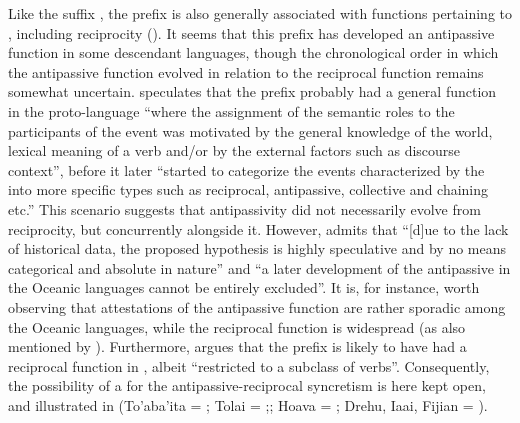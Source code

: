 Like the  suffix , the  prefix  is also generally associated with functions pertaining to , including reciprocity (). It seems that this prefix has developed an antipassive function in some descendant languages, though the chronological order in which the antipassive function evolved in relation to the reciprocal function remains somewhat uncertain. \cite[178]{janic:2016} speculates that the prefix probably had a general function in the proto-language “where the assignment of the semantic roles to the participants of the event was motivated by the general knowledge of the world, lexical meaning of a verb and/or by the external factors such as discourse context”, before it later “started to categorize the events characterized by the  into more specific types such as reciprocal, antipassive, collective and chaining etc.” This scenario suggests that antipassivity did not necessarily evolve from reciprocity, but concurrently alongside it. However, \cite[178f.]{janic:2016} admits that “[d]ue to the lack of historical data, the proposed hypothesis is highly speculative and by no means categorical and absolute in nature” and “a later development of the antipassive in the Oceanic languages cannot be entirely excluded”. It is, for instance, worth observing that attestations of the antipassive function are rather sporadic among the Oceanic languages, while the reciprocal function is widespread (as also mentioned by \citealt[160]{janic:2016}). Furthermore, \cite[151]{pawley:1973} argues that the prefix  is likely to have had a reciprocal function in , albeit “restricted to a subclass of verbs”. Consequently, the possibility of a  for the antipassive-reciprocal syncretism is here kept open, and illustrated in  (To’aba’ita = \citealt[1552, 1560]{lichtenberk:2007}; Tolai = \citealt[146f.]{mosel:1984};; Hoava = \citealt[136f.]{davis:2003}; Drehu, Iaai, Fijian = \citealt[35ff., 47, 57]{bril:2005}).

